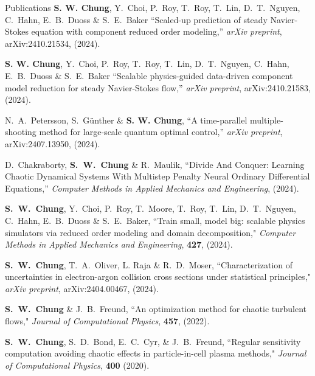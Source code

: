 \documentclass{resume} %
\begin{document}
\clearpage
\begin{rSection}{Publications}
\textbf{S. W. Chung}, Y.\ Choi, P.\ Roy, T.\ Roy, T.\ Lin, D.\ T.\ Nguyen, C.\ Hahn, E.\ B.\ Duoss \& S.\ E.\ Baker
``Scaled-up prediction of steady Navier-Stokes equation with component reduced order modeling,''
\textit{arXiv preprint}, arXiv:2410.21534, (2024).
\par
\textbf{S. W. Chung}, Y.\ Choi, P.\ Roy, T.\ Roy, T.\ Lin, D.\ T.\ Nguyen, C.\ Hahn, E.\ B.\ Duoss \& S.\ E.\ Baker
``Scalable physics-guided data-driven component model reduction for steady Navier-Stokes flow,''
\textit{arXiv preprint}, arXiv:2410.21583, (2024).
\par
N.\ A.\ Petersson, S.\ G{\"u}nther \& \textbf{S. W. Chung},
``A time-parallel multiple-shooting method for large-scale quantum optimal control,''
\textit{arXiv preprint}, arXiv:2407.13950, (2024).
\par
D.\ Chakraborty, \textbf{S.\ W.\ Chung} \& R.\ Maulik,
``Divide And Conquer: Learning Chaotic Dynamical Systems With Multistep Penalty Neural Ordinary Differential Equations,''
\textit{Computer Methods in Applied Mechanics and Engineering}, (2024).
\par
\textbf{S.\ W.\ Chung}, Y.\ Choi, P.\ Roy, T.\ Moore, T.\ Roy, T.\ Lin, D.\ T.\ Nguyen, C.\ Hahn, E.\ B.\ Duoss \& S.\ E.\ Baker,
``Train small, model big: scalable physics simulators via reduced order modeling and domain decomposition,"
\textit{Computer Methods in Applied Mechanics and Engineering}, \textbf{427}, (2024).
\par
\textbf{S.\ W.\ Chung}, T.\ A.\ Oliver, L. Raja \& R.\ D.\ Moser,
``Characterization of uncertainties in electron-argon collision cross sections under statistical principles,"
\textit{arXiv preprint}, arXiv:2404.00467, (2024).
\par
\par
\textbf{S.\ W.\ Chung} \& J.\ B.\ Freund,
``An optimization method for chaotic turbulent flows,"
\textit{Journal of Computational Physics}, \textbf{457}, (2022).
\par
\textbf{S.\ W.\ Chung}, S.\ D.\ Bond, E.\ C.\ Cyr, \& J.\ B.\ Freund,
``Regular sensitivity computation avoiding chaotic effects in particle-in-cell plasma methods,"
\textit{Journal of Computational Physics}, \textbf{400} (2020).
\end{rSection}
\end{document}
